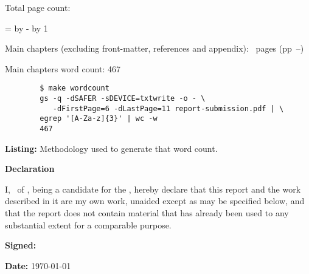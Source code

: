\begin{sffamily}

Total page count: \pageref{LastPage}

\makeatletter
\@tempcnta=\relax%
\advance\@tempcnta by -%
\advance\@tempcnta by 1%
\xdef\contentpages{\the\@tempcnta}%
\makeatother

Main chapters (excluding front-matter, references and appendix):
\contentpages~pages
(pp~\pageref{firstcontentpage}--\pageref{lastcontentpage})

Main chapters word count: 467





\vspace*{2em}
\begin{code}
    \begin{verbatim}
        $ make wordcount
        gs -q -dSAFER -sDEVICE=txtwrite -o - \
           -dFirstPage=6 -dLastPage=11 report-submission.pdf | \
        egrep '[A-Za-z]{3}' | wc -w
        467
    \end{verbatim}
    \captionsetup{textfont=sf}
    \caption*{\textbf{Listing:} Methodology used to generate that word count.}
\end{code}


\end{sffamily}


\vspace{\fill}
\onehalfspacing
\ifsubmission\else\makeatletter
\textbf{\Huge Declaration}
\vspace{40pt}

I, \@author\ of \college, being a candidate for the \course, hereby
declare that this report and the work described in it are my own work,
unaided except as may be specified below, and that the report does not
contain material that has already been used to any substantial extent
for a comparable purpose.


\bigskip 
\textbf{Signed:} %

\bigskip
\textbf{Date:} \today
\vspace{\fill}
\makeatother\fi